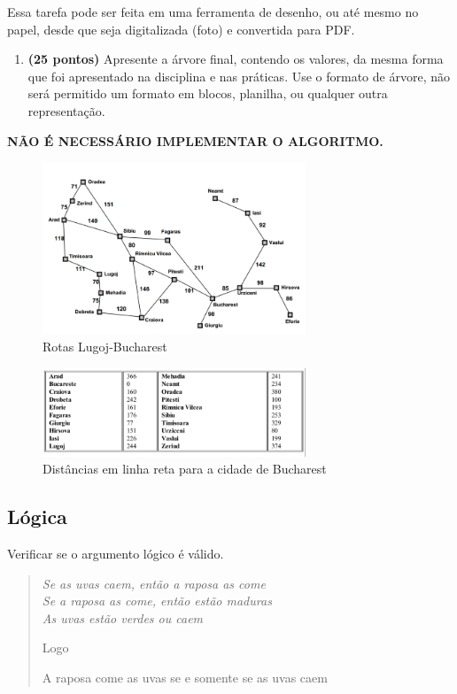     Essa tarefa pode ser feita em uma ferramenta de desenho, ou até mesmo no papel, desde que seja digitalizada (foto) e convertida para PDF.
    \begin{enumerate}[label=\alph*)]
        \item \textbf{(25 pontos)} Apresente a árvore final, contendo os valores, da mesma forma que foi apresentado na disciplina e nas práticas. Use o formato de árvore, não será permitido um formato em blocos, planilha, ou qualquer outra representação.
    \end{enumerate}

    \textbf{NÃO É NECESSÁRIO IMPLEMENTAR O ALGORITMO.}
    \begin{figure}[H]
        \centering
        \includegraphics[width=0.7\textwidth]{apendices/fig/1_IAA001_1.png} 
        \caption{Rotas Lugoj-Bucharest}
    \end{figure}
    \begin{figure}[H]
        \centering
        \includegraphics[width=0.7\textwidth]{apendices/fig/1_IAA001_2.png} 
        \caption{Distâncias em linha reta para a cidade de Bucharest}
    \end{figure}

\subsection{Lógica}
    Verificar se o argumento lógico é válido.

    \begin{adjustwidth}{3em}{}
        \begin{quote}
            \itshape
            Se as uvas caem, então a raposa as come \\
            Se a raposa as come, então estão maduras \\
            As uvas estão verdes ou caem

            Logo

            A raposa come as uvas se e somente se as uvas caem
        \end{quote}
    \end{adjustwidth}

